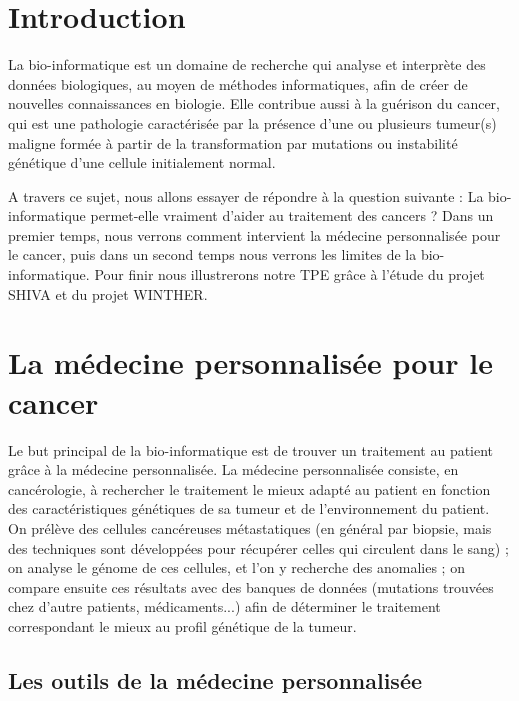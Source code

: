 \documentclass[12pt, openany]{report}
\begin{document}
\tableofcontents



\chapter{Introduction}

La bio-informatique est un domaine de recherche qui analyse et interprète des données biologiques, au moyen de méthodes informatiques, afin de créer de nouvelles connaissances en biologie. Elle contribue aussi à la guérison du cancer, qui est une pathologie caractérisée par la présence d'une ou plusieurs tumeur(s) maligne formée à partir de la transformation par mutations ou instabilité génétique d'une cellule initialement normal. 

A travers ce sujet, nous allons essayer de répondre à la question suivante : La bio-informatique permet-elle vraiment d'aider au traitement des cancers ? Dans un premier temps, nous verrons comment intervient la médecine personnalisée pour le cancer, puis dans un second temps nous verrons les limites de la bio-informatique. Pour finir nous illustrerons notre TPE grâce à l’étude du projet SHIVA et du projet WINTHER. 



\chapter{La médecine personnalisée pour le cancer}

Le but principal de la bio-informatique est de trouver un traitement au patient grâce à la médecine personnalisée. La médecine personnalisée consiste, en cancérologie, à rechercher le traitement le mieux adapté au patient en fonction des caractéristiques génétiques de sa tumeur et de l'environnement du patient. On prélève des cellules cancéreuses métastatiques (en général par biopsie, mais des techniques sont développées pour récupérer celles qui circulent dans le sang) ; 
on analyse le génome de ces cellules, et l'on y recherche des anomalies ; 
on compare ensuite ces résultats avec des banques de données (mutations trouvées chez d'autre patients, médicaments...) afin de déterminer le traitement correspondant le mieux au profil génétique de la tumeur.

\section{Les outils de la médecine personnalisée}
\end{document}
